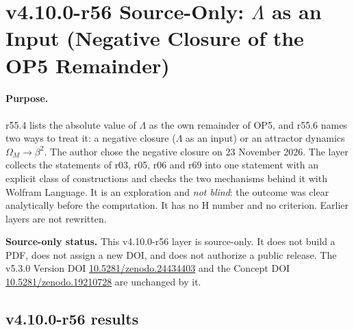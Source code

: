 \clearpage
\section*{v4.10.0-r56 Source-Only: \texorpdfstring{\(\Lambda\)}{Lambda} as an Input (Negative Closure of the OP5 Remainder)}
\label{sec:v4100-r56-lambda-input}

\paragraph{Purpose.}
r55.4 lists the absolute value of \(\Lambda\) as the own remainder of OP5, and r55.6 names two ways to treat it: a negative closure (\(\Lambda\) as an
input) or an attractor dynamics \(\Omega_M\to\beta^2\).  The author chose the negative closure on 23 November 2026.  The layer collects the
statements of r03, r05, r06 and r69 into one statement with an explicit class of constructions and checks the two mechanisms behind it with
Wolfram Language.  It is an exploration and \emph{not blind}: the outcome was clear analytically before the computation.  It has no H number and no
criterion.  Earlier layers are not rewritten.

\noindent\textbf{Source-only status.}
This v4.10.0-r56 layer is source-only.  It does not build a PDF, does not assign a new DOI,
and does not authorize a public release.  The v5.3.0 Version DOI
\href{https://doi.org/10.5281/zenodo.24434403}{10.5281/zenodo.24434403} and the Concept DOI
\href{https://doi.org/10.5281/zenodo.19210728}{10.5281/zenodo.19210728} are unchanged by it.

\subsection*{v4.10.0-r56 results}
\label{subsec:v4100-r56-results}

